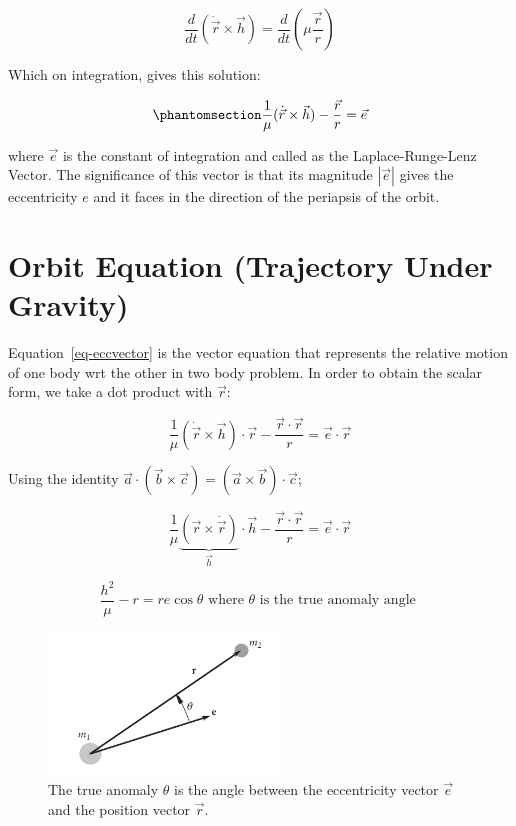 \documentclass[
  letterpaper,
  DIV=11,
  numbers=noendperiod]{scrreprt}
\begin{document}
\[
\frac{d}{dt}\left(\dot{\vec r}\times \vec h\right)= \frac{d}{dt}\left(\mu\frac{\vec r}{r}\right)
\]

Which on integration, gives this solution:

\begin{equation}\phantomsection\label{eq-eccvector}{
\frac{1}{\mu}(\dot{\vec{r}}\times \vec h)-\frac{\vec r}{r}=\vec e
}\end{equation}

where \(\vec e\) is the constant of integration and called as the
Laplace-Runge-Lenz Vector. The significance of this vector is that its
magnitude \(|\vec e|\) gives the eccentricity \(e\) and it faces in the
direction of the periapsis of the orbit.

\section{Orbit Equation (Trajectory Under
Gravity)}\label{orbit-equation-trajectory-under-gravity}

Equation~\ref{eq-eccvector} is the vector equation that represents the
relative motion of one body wrt the other in two body problem. In order
to obtain the scalar form, we take a dot product with \(\vec r\):

\[
\frac{1}{\mu}(\dot{\vec{r}}\times \vec h)\cdot \vec r-\frac{\vec r\cdot \vec r}{r}=\vec e\cdot \vec r
\]

Using the identity
\(\vec a \cdot (\vec b \times \vec c)=(\vec a \times \vec b)\cdot \vec c\);

\[
\frac{1}{\mu}\underbrace{(\vec r \times \dot{\vec r})}_{\vec h}\cdot \vec h- \frac{\vec r\cdot\vec r}{r}=\vec e\cdot\vec r
\]

\[
\frac{h^2}{\mu}-r=re\cos{\theta} \text{ where } \theta \text{ is the true anomaly angle }
\]

\begin{figure}[H]

{\centering \includegraphics[width=2.40625in,height=\textheight,keepaspectratio]{fig2_2.jpeg}

}

\caption{The true anomaly \(\theta\) is the angle between the
eccentricity vector \(\vec{e}\) and the position vector \(\vec{r}\).}

\end{figure}%
\end{document}
